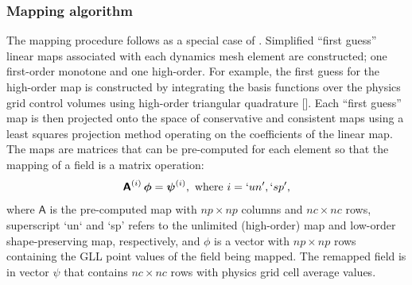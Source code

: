\documentclass[twocol]{ametsoc}
\begin{document}
\subsubsection{Mapping algorithm}  The mapping procedure follows as a special case of \citet{UT2015MWR}.  Simplified ``first guess'' linear maps associated with each dynamics mesh element are constructed; one first-order monotone and one high-order. For example, the first guess for the high-order map is constructed by integrating the basis functions over the physics grid control volumes using high-order triangular quadrature [{\color{red}{paul: what are we using here?}}]. Each ``first guess'' map is then projected onto the space of conservative and consistent maps using a least squares projection method operating on the coefficients of the linear map. The maps are matrices that can be pre-computed for each element so that the mapping of a field is a matrix operation:
\begin{equation}
\bm{\mathsf{A}}^{(i)}\, \bm{\mathsf{\phi}}=\bm{\mathsf{\psi}}^{(i)},\text{ where }i=`un',`sp', 
\end{equation}
where $\bm{\mathsf{A}}$ is the pre-computed map with $np\times np$ columns and $nc\times nc$ rows, superscript `un` and `sp' refers to the unlimited (high-order) map and low-order shape-preserving map, respectively, and $\bm{\mathsf{\phi}}$ is a vector with $np\times np$ rows containing the GLL point values of the field being mapped. The remapped field is in vector $\bm{\mathsf{\psi}}$ that contains $nc\times nc$ rows with physics grid cell average values.
\end{document}
